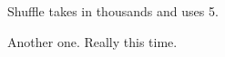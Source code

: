 \documentclass[handout]{ximera}
\begin{document}
Shuffle takes in thousands and uses 5.



\begin{shuffle}[5]
\end{shuffle}

%
%
%
%
%

Another one.  Really this time.
\end{document}
